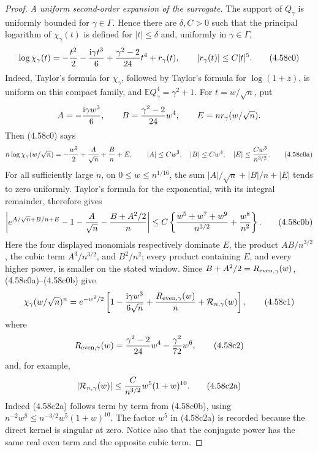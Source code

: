 \documentclass[11pt,a4paper]{article}
\numberwithin{equation}{section}
\theoremstyle{definition}
\theoremstyle{remark}
\newcommand{\E}{\mathbb E}
\newcommand{\ii}{\mathrm i}
\begin{document}
\begin{proof}
\emph{A uniform second-order expansion of the surrogate.}
The support of \(Q_\gamma\) is uniformly bounded for
\(\gamma\in\Gamma\).  Hence there are \(\delta,C>0\) such that the
principal logarithm of \(\chi_\gamma(t)\) is defined for
\(|t|\le\delta\) and, uniformly in \(\gamma\in\Gamma\),
\[
 \log\chi_\gamma(t)=-{t^2\over2}-{\ii\gamma t^3\over6}
       +{\gamma^2-2\over24}t^4+r_\gamma(t),
       \qquad |r_\gamma(t)|\le C|t|^5.               \tag{4.58c0}
\]
Indeed, Taylor's formula for \(\chi_\gamma\), followed by Taylor's
formula for \(\log(1+z)\), is uniform on this compact family, and
\(\E Q_\gamma^4=\gamma^2+1\).  For \(t=w/\sqrt n\), put
\[
 A=-{\ii\gamma w^3\over6},\qquad
 B={\gamma^2-2\over24}w^4,\qquad
 E=n r_\gamma(w/\sqrt n).
\]
Then (4.58c0) says
\[
 n\log\chi_\gamma(w/\sqrt n)
 =-{w^2\over2}+{A\over\sqrt n}+{B\over n}+E,
 \qquad
 |A|\le Cw^3,\quad |B|\le Cw^4,\quad
 |E|\le {Cw^5\over n^{3/2}}.                        \tag{4.58c0a}
\]
For all sufficiently large \(n\), on \(0\le w\le n^{1/16}\), the sum
\(|A|/\sqrt n+|B|/n+|E|\) tends to zero uniformly.  Taylor's formula
for the exponential, with its integral remainder, therefore gives
\[
 \left|e^{A/\sqrt n+B/n+E}
 -1-{A\over\sqrt n}-{B+A^2/2\over n}\right|
 \le C\left\{{w^5+w^7+w^9\over n^{3/2}}
                  +{w^8\over n^2}\right\}.          \tag{4.58c0b}
\]
Here the four displayed monomials respectively dominate \(E\), the
product \(AB/n^{3/2}\), the cubic term \(A^3/n^{3/2}\), and
\(B^2/n^2\); every product containing \(E\), and every higher power, is
smaller on the stated window.  Since
\(B+A^2/2=R_{\rm even,\gamma}(w)\), (4.58c0a)--(4.58c0b) give
\[
 \chi_\gamma(w/\sqrt n)^n=e^{-w^2/2}
 \left[1-{\ii\gamma w^3\over6\sqrt n}
       +{R_{\rm even,\gamma}(w)\over n}
       +\mathcal R_{n,\gamma}(w)\right],             \tag{4.58c1}
\]
where
\[
 R_{\rm even,\gamma}(w)={\gamma^2-2\over24}w^4
                    -{\gamma^2\over72}w^6,           \tag{4.58c2}
\]
and, for example,
\[
 |\mathcal R_{n,\gamma}(w)|
       \le {C\over n^{3/2}}w^5(1+w)^{10}.             \tag{4.58c2a}
\]
Indeed (4.58c2a) follows term by term from (4.58c0b), using
\(n^{-2}w^8\le n^{-3/2}w^5(1+w)^{10}\).
The factor \(w^5\) in (4.58c2a) is recorded because the direct kernel is
singular at zero.  Notice also that the conjugate power has the same real
even term and the opposite cubic term.


\end{proof}
\end{document}
